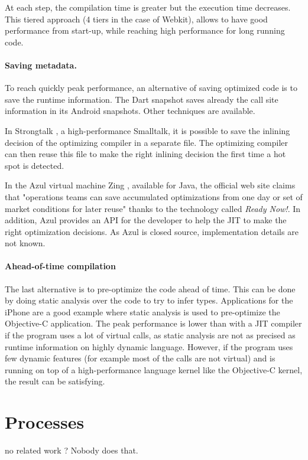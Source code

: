 \documentclass[a4paper,12pt,twoside]{../includes/ThesisStyle}
\begin{document}
At each step, the compilation time is greater but the execution time decreases. This tiered approach (4 tiers in the case of Webkit), allows to have good performance from start-up, while reaching high performance for long running code.

\paragraph{Saving metadata.}

To reach quickly peak performance, an alternative of saving optimized code is to save the runtime information. The Dart snapshot saves already the call site information in its Android snapshots. Other techniques are available.

In Strongtalk \cite{Sun06}, a high-performance Smalltalk, it is possible to save the inlining decision of the optimizing compiler in a separate file. The optimizing compiler can then reuse this file to make the right inlining decision the first time a hot spot is detected.

In the Azul virtual machine Zing \cite{Azul}, available for Java, the official web site claims that "operations teams can save accumulated optimizations from one day or set of market conditions for later reuse" thanks to the technology called \emph{Ready Now!}. In addition, Azul provides an API for the developer to help the JIT to make the right optimization decisions. As Azul is closed source, implementation details are not known. 

\paragraph{Ahead-of-time compilation}

The last alternative is to pre-optimize the code ahead of time. This can be done by doing static analysis over the code to try to infer types. Applications for the iPhone are a good example where static analysis is used to pre-optimize the Objective-C application. The peak performance is lower than with a JIT compiler if the program uses a lot of virtual calls, as static analysis are not as precised as runtime information on highly dynamic language. 
However, if the program uses few dynamic features (for example most of the calls are not virtual) and is running on top of a high-performance language kernel like the Objective-C kernel, the result can be satisfying.


\section{Processes}

no related work ?
Nobody does that.

\ifx\wholebook\relax\else
    
\end{document}
